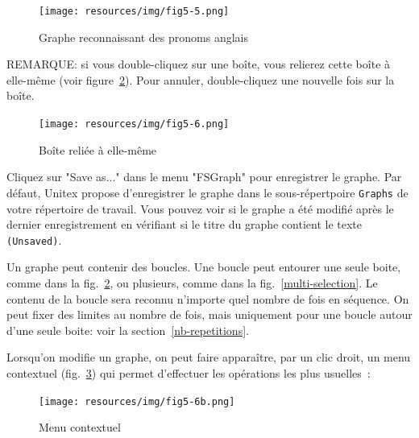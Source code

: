 \begin{figure}[!ht]
\begin{center}
\texttt{[image: resources/img/fig5-5.png]}
\caption{Graphe reconnaissant des pronoms anglais\label{fig-pronoun-graph}}
\end{center}
\end{figure}

\bigskip
\noindent REMARQUE: si vous double-cliquez sur une boîte, vous relierez cette boîte à elle-même (voir
figure~\ref{fig-loop-box}). Pour annuler, double-cliquez une nouvelle fois sur la boîte.

\bigskip
\begin{figure}[!ht]
\begin{center}
\texttt{[image: resources/img/fig5-6.png]}
\caption{Boîte reliée à elle-même\label{fig-loop-box}}
\end{center}
\end{figure}

\noindent Cliquez sur "Save as..." dans le menu "FSGraph" pour enregistrer le
graphe. Par défaut, Unitex propose d'enregistrer le graphe dans le 
sous-répertpoire \verb+Graphs+ de votre répertoire de travail.
Vous pouvez voir si le graphe a été
modifié après le dernier enregistrement  en vérifiant si le titre du graphe contient le texte
\verb+(Unsaved)+.

\bigskip
\noindent  Un graphe peut contenir des boucles. Une boucle peut entourer une
seule boite, comme dans la fig.~\ref{fig-loop-box}, ou plusieurs, comme dans la
 fig.~\ref{multi-selection}. Le contenu de la boucle sera reconnu n'importe quel nombre
de fois en séquence. On peut fixer des limites au nombre de fois, mais uniquement pour
une boucle autour d'une seule boite: voir la section~\ref{nb-repetitions}.

\bigskip
\noindent Lorsqu'on modifie un graphe, on peut faire apparaître, par un clic droit, un menu
contextuel (fig.~\ref{contextual-menu}) qui permet d'effectuer les opérations les plus usuelles~:

\bigskip
\begin{figure}[!ht]
\begin{center}
\texttt{[image: resources/img/fig5-6b.png]}
\caption{Menu contextuel\label{contextual-menu}}
\end{center}
\end{figure}

